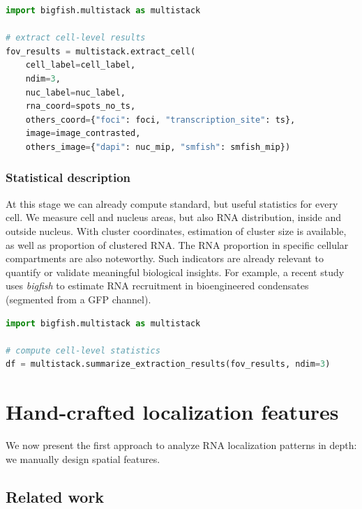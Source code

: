 \begin{minipage}{0.9\textwidth}
\begin{lstlisting}[language=Python]
import bigfish.multistack as multistack

# extract cell-level results
fov_results = multistack.extract_cell(
    cell_label=cell_label,
    ndim=3,
    nuc_label=nuc_label,
    rna_coord=spots_no_ts,
    others_coord={"foci": foci, "transcription_site": ts},
    image=image_contrasted,
    others_image={"dapi": nuc_mip, "smfish": smfish_mip})
\end{lstlisting}
\end{minipage}

\subsubsection{Statistical description}

At this stage we can already compute standard, but useful statistics for every cell.
We measure cell and nucleus areas, but also \ac{RNA} distribution, inside and outside nucleus.
With cluster coordinates, estimation of cluster size is available, as well as proportion of clustered \ac{RNA}.
The \ac{RNA} proportion in specific cellular compartments are also noteworthy.
Such indicators are already relevant to quantify or validate meaningful biological insights.
For example, a recent study~\cite{cochard_rna_2022} uses \emph{bigfish} to estimate \ac{RNA} recruitment in bioengineered condensates (segmented from a \ac{GFP} channel).\\

\begin{minipage}{0.9\textwidth}
\begin{lstlisting}[language=Python]
import bigfish.multistack as multistack

# compute cell-level statistics
df = multistack.summarize_extraction_results(fov_results, ndim=3)
\end{lstlisting}
\end{minipage}

\section{Hand-crafted localization features}
\label{sec:hand_features}

We now present the first approach to analyze \ac{RNA} localization patterns in depth: we manually design spatial features.

\subsection{Related work}
\label{subsec:related_work_hand_features}

